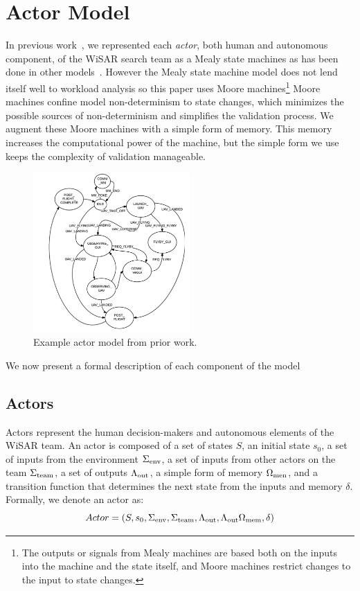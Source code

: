\section{Actor Model} 

In previous work~\cite{gledhill2013modelinguas}, we represented each {\em actor}, both human and autonomous component, of the WiSAR search team as a Mealy state machines as has been done in other models~\cite{bolton2013litreview}. However the Mealy state machine model does not lend itself well to workload analysis so this paper uses Moore machines\footnote{The outputs or signals from Mealy machines are based both on the inputs into the machine and the state itself,  and Moore machines restrict changes to the input to state changes.} Moore machines confine model non-determinism to state changes, which minimizes the possible sources of non-determinism and simplifies the validation process.  We augment these Moore machines with a simple form of memory.  This memory increases the computational power of the machine, but the simple form we use keeps the complexity of validation manageable.

\begin{figure}[h]
\center
\setlength{\abovecaptionskip}{1mm}
\setlength{\belowcaptionskip}{1mm}
\setlength{\textfloatsep}{1mm}
\setlength{\floatsep}{1mm}
\includegraphics[height=2.4in]{DiRG.png}
\caption{Example actor model from prior work.}
\label{fig:dirg}
\end{figure}

We now present a formal description of each component of the model
\subsection{Actors}
Actors represent the human decision-makers and autonomous elements of the WiSAR team.  An actor is composed of a set of states $S$, an initial state $s_0$, a set of inputs from the environment $\Sigma_{\rm env}$, a set of inputs from other actors on the team $\Sigma_{\rm team}$, a set of outputs $\Lambda_{\rm out}$, a simple form of memory $\Omega_{\rm men}$, and a transition function that determines the next state from the inputs and memory $\delta$. Formally, we denote an actor as:
\begin{equation}
 	Actor = (S, s_0, \Sigma_{\rm env}, \Sigma_{\rm team}, \Lambda_{\rm out}, \Lambda_{\rm out} \Omega_{\rm mem},\delta)
 \label{eq:actor}
 \end{equation}
 

